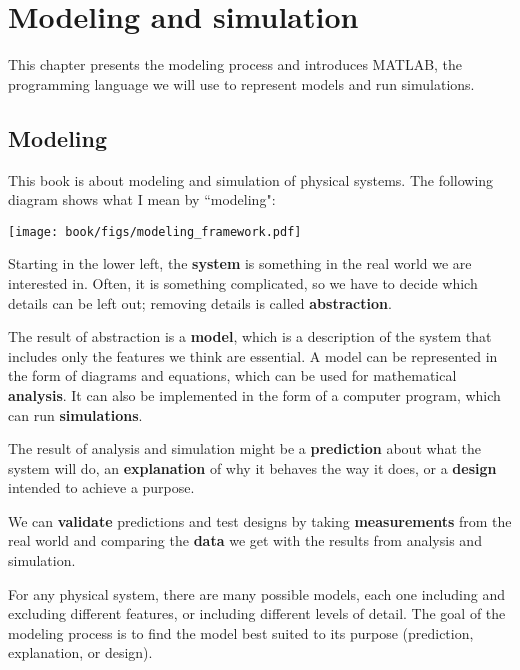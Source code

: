 \documentclass[main.tex]{subfiles}
\begin{document}
\chapter{Modeling and simulation}
\label{chpt:modeling}

This chapter presents the modeling process and introduces MATLAB, the programming language we will use to represent models and run simulations.


\section{Modeling}

This book is about modeling and simulation of physical systems.  
The following diagram shows what I mean by ``modeling":


\vspace{0.2in}
\centerline{\texttt{[image: book/figs/modeling\_framework.pdf]}}

Starting in the lower left, the {\bf system} is something in the real world we are interested in.  Often, it is something complicated, so we have to decide which details can be left out; removing details is called {\bf abstraction}.


The result of abstraction is a {\bf model}, which is a description of the system that includes only the features we think are essential.  A model can be represented in the form of diagrams and equations, which can be used for mathematical {\bf analysis}.  It can also be implemented in the form of a computer program, which can run {\bf simulations}.


The result of analysis and simulation might be a {\bf prediction} about what the system will do, an {\bf explanation} of why it behaves the way it does, or a {\bf design} intended to achieve a purpose.


We can {\bf validate} predictions and test designs by taking {\bf measurements} from the real world and comparing the {\bf data} we get with the results from analysis and simulation. 


For any physical system, there are many possible models, each one including and excluding different features, or including different levels of detail.  The goal of the modeling process is to find the model best suited to its purpose (prediction, explanation, or design).
\end{document}
